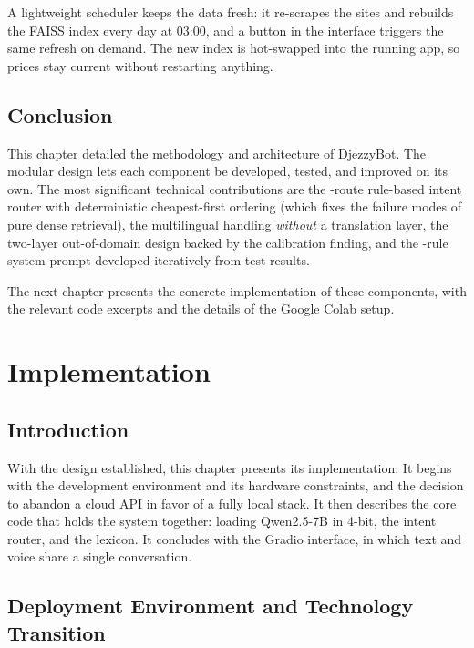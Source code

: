 \documentclass[12pt, a4paper]{report}
\newcommand{\humantext}[1]{#1}      %
\begin{document}
\humantext{A lightweight scheduler keeps the data fresh: it re-scrapes the sites and rebuilds the FAISS index every day at 03:00, and a button in the interface triggers the same refresh on demand. The new index is hot-swapped into the running app, so prices stay current without restarting anything.}

\section{Conclusion}
\humantext{This chapter detailed the methodology and architecture of DjezzyBot. The modular design lets each component be developed, tested, and improved on its own. The most significant technical contributions are the \numRoutes{}-route rule-based intent router with deterministic cheapest-first ordering (which fixes the failure modes of pure dense retrieval), the multilingual handling \emph{without} a translation layer, the two-layer out-of-domain design backed by the calibration finding, and the \numRules{}-rule system prompt developed iteratively from test results.}

\humantext{The next chapter presents the concrete implementation of these components, with the relevant code excerpts and the details of the Google Colab setup.}



\chapter{Implementation}

\section{Introduction}
\humantext{With the design established, this chapter presents its implementation.} \humantext{It begins with the development environment and its hardware constraints, and the decision to abandon a cloud API in favor of a fully local stack. It then describes the core code that holds the system together: loading Qwen2.5-7B in 4-bit, the intent router, and the lexicon. It concludes with the Gradio interface, in which text and voice share a single conversation.}

\section{Deployment Environment and Technology Transition}
\end{document}
